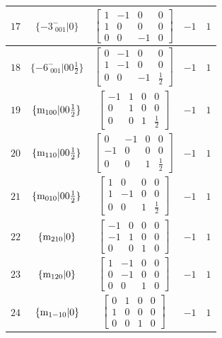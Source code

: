 \documentclass[fleqn,8pt]{jsarticle}
\begin{document}
\begin{longtable}{ccccc}
$ 17 $ & $ \{-3^{-}_{\,\,001}|0\} $ & $ \begin{bmatrix} 1 & -1 & 0 & 0 \\ 1 & 0 & 0 & 0 \\ 0 & 0 & -1 & 0 \end{bmatrix} $ & $ -1 $ & $ 1 $ \\ \hline
$ 18 $ & $ \{-6^{-}_{\,\,001}|0 0 \frac{1}{2}\} $ & $ \begin{bmatrix} 0 & -1 & 0 & 0 \\ 1 & -1 & 0 & 0 \\ 0 & 0 & -1 & \frac{1}{2} \end{bmatrix} $ & $ -1 $ & $ 1 $ \\ \hline
$ 19 $ & $ \{{\rm m}_{100}|0 0 \frac{1}{2}\} $ & $ \begin{bmatrix} -1 & 1 & 0 & 0 \\ 0 & 1 & 0 & 0 \\ 0 & 0 & 1 & \frac{1}{2} \end{bmatrix} $ & $ -1 $ & $ 1 $ \\ \hline
$ 20 $ & $ \{{\rm m}_{110}|0 0 \frac{1}{2}\} $ & $ \begin{bmatrix} 0 & -1 & 0 & 0 \\ -1 & 0 & 0 & 0 \\ 0 & 0 & 1 & \frac{1}{2} \end{bmatrix} $ & $ -1 $ & $ 1 $ \\ \hline
$ 21 $ & $ \{{\rm m}_{010}|0 0 \frac{1}{2}\} $ & $ \begin{bmatrix} 1 & 0 & 0 & 0 \\ 1 & -1 & 0 & 0 \\ 0 & 0 & 1 & \frac{1}{2} \end{bmatrix} $ & $ -1 $ & $ 1 $ \\ \hline
$ 22 $ & $ \{{\rm m}_{210}|0\} $ & $ \begin{bmatrix} -1 & 0 & 0 & 0 \\ -1 & 1 & 0 & 0 \\ 0 & 0 & 1 & 0 \end{bmatrix} $ & $ -1 $ & $ 1 $ \\ \hline
$ 23 $ & $ \{{\rm m}_{120}|0\} $ & $ \begin{bmatrix} 1 & -1 & 0 & 0 \\ 0 & -1 & 0 & 0 \\ 0 & 0 & 1 & 0 \end{bmatrix} $ & $ -1 $ & $ 1 $ \\ \hline
$ 24 $ & $ \{{\rm m}_{1-10}|0\} $ & $ \begin{bmatrix} 0 & 1 & 0 & 0 \\ 1 & 0 & 0 & 0 \\ 0 & 0 & 1 & 0 \end{bmatrix} $ & $ -1 $ & $ 1 $ \\ \hline

\end{longtable}
\end{document}
